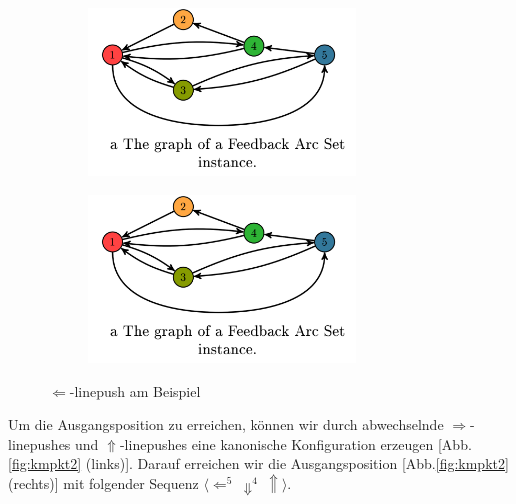 \documentclass[seminar,german]{algothesis}
\begin{document}
\begin{figure}[ht]
	\centering
	\begin{subfigure}{.4\textwidth}
		\includegraphics[width=0.78\textwidth]{graph}
    \end{subfigure}%
    \begin{subfigure}{.4\textwidth}
		\includegraphics[width=0.78\textwidth]{graph}
    \end{subfigure}
    \caption{$\Leftarrow$-linepush am Beispiel}
    \label{fig:kmpkt1}
\end{figure}

\noindent Um die Ausgangsposition zu erreichen, können wir durch abwechselnde $\Rightarrow$-linepushes und $\Uparrow$-linepushes eine kanonische Konfiguration erzeugen [Abb.\ref{fig:kmpkt2} (links)]. Darauf erreichen wir die Ausgangsposition [Abb.\ref{fig:kmpkt2} (rechts)] mit folgender Sequenz $\langle  \Leftarrow^5~\Downarrow^4 ~\Uparrow\rangle$.
\end{document}
